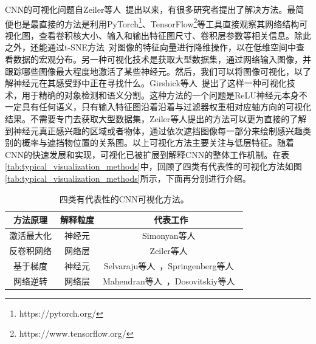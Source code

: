 CNN的可视化问题自Zeiler等人~\cite{zeiler2014visualizing}提出以来，有很多研究者提出了解决方法。最简便也是最直接的方法是利用PyTorch\footnote{https://pytorch.org/}、TensorFlow\footnote{https://www.tensorflow.org/}等工具直接观察其网络结构可视化图，查看卷积核大小、输入和输出特征图尺寸、卷积层参数等相关信息。除此之外，还能通过t-SNE方法~\cite{maaten2008visualizing}对图像的特征向量进行降维操作，以在低维空间中查看数据的宏观分布。另一种可视化技术是获取大型数据集，通过网络输入图像，并跟踪哪些图像最大程度地激活了某些神经元。然后，我们可以将图像可视化，以了解神经元在其感受野中正在寻找什么。Girshick等人~\cite{girshick2014rich}提出了这样一种可视化技术，用于精确的对象检测和语义分割。这种方法的一个问题是ReLU神经元本身不一定具有任何语义，只有输入特征图沿着沿着与过滤器权重相对应轴方向的可视化结果。不需要专门去获取大型数据集，Zeiler等人提出的方法可以更为直接的了解到神经元真正感兴趣的区域或者物体，通过依次遮挡图像每一部分来绘制感兴趣类别的概率与遮挡物位置的关系图。以上可视化方法主要关注与低层特征。随着CNN的快速发展和实现，可视化已被扩展到解释CNN的整体工作机制。在表\ref{tab:typical_visualization_methods}中，回顾了四类有代表性的可视化方法如图\ref{tab:typical_visualization_methods}所示，下面再分别进行介绍。
\begin{table}[h]
	\centering
	\caption{四类有代表性的CNN可视化方法。}		
	\label{tab:typical_visualization_methods}
	\begin{tabular}{c|c|c}
		\toprule[2pt]
		方法原理 & 解释粒度 & 代表工作 \\ \midrule[2pt]
		激活最大化 & 神经元  & Simonyan等人~\cite{simonyan2013deep}  \\\hline
		反卷积网络 & 网络层  & Zeiler等人~\cite{zeiler2014visualizing, zeiler2010deconvolutional, zeiler2011adaptive} \\\hline
		基于梯度 &  神经元 & Selvaraju等人~\cite{selvaraju2017grad}，Springenberg等人~\cite{springenberg2014striving} \\  \hline
		网络逆转 & 网络层 &Mahendran等人~\cite{mahendran2015understanding, mahendran2016visualizing}，Dosovitskiy等人~\cite{dosovitskiy2016inverting}\\
		\bottomrule[2pt]
	\end{tabular}
	\label{tab:four_visulization_types}
\end{table}
